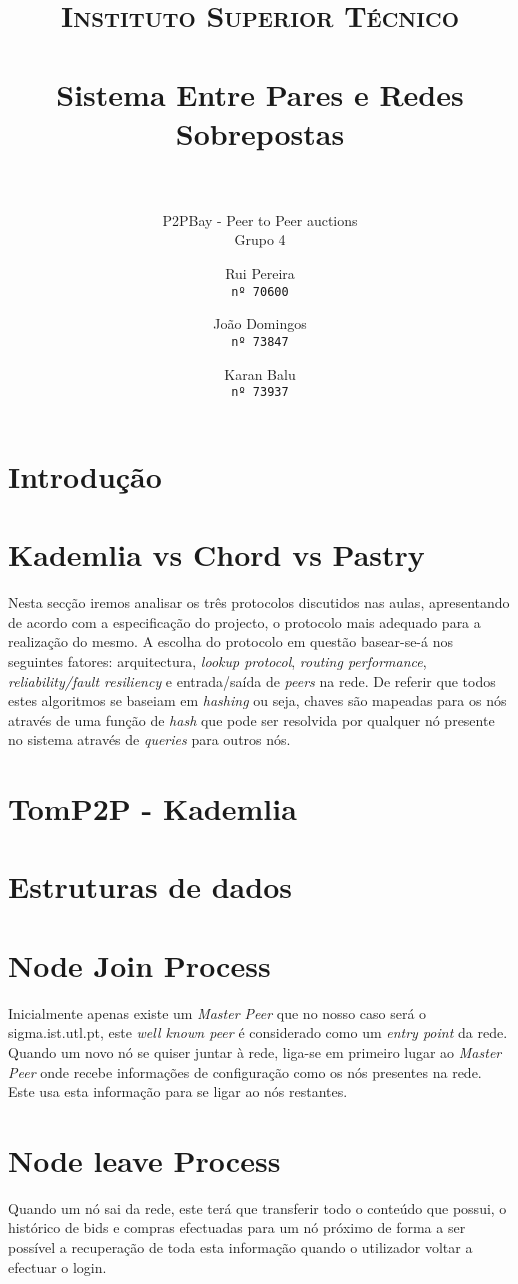 \documentclass[paper=a4, fontsize=11pt]{scrartcl}
\title{
		\usefont{OT1}{bch}{b}{n}
		\normalfont \normalsize \textsc{Instituto Superior Técnico} \\ [25pt]
		\horrule{0.5pt} \\[0.4cm]
		\huge Sistema Entre Pares e Redes Sobrepostas \\
		\horrule{2pt} \\[0.5cm]
}
\subtitle{P2PBay - Peer to Peer auctions\\\vspace{5mm}\small Grupo 4}
\author{
  \normalsize Rui Pereira\\
  \normalsize \texttt{nº 70600}
  \and
  \normalsize João Domingos\\
  \normalsize \texttt{nº 73847}
  \and
  \normalsize Karan Balu\\
  \normalsize \texttt{nº 73937}
}
\date{}
\numberwithin{equation}{section}		%
\numberwithin{figure}{section}			%
\numberwithin{table}{section}				%
\begin{document}
\maketitle
\section{Introdução}
\section{Kademlia vs Chord vs Pastry}
Nesta secção iremos analisar os três protocolos discutidos nas aulas, apresentando de acordo com a especificação do projecto, o protocolo mais
adequado para a realização do mesmo. A escolha do protocolo em questão basear-se-á nos seguintes fatores: arquitectura, \textit{lookup protocol}, \textit{routing performance}, \textit{reliability/fault resiliency} e entrada/saída de \textit{peers} na rede. De referir que todos estes algoritmos
se baseiam em \textit{hashing} ou seja, chaves são mapeadas para os nós através de uma função de \textit{hash} que pode ser resolvida por qualquer 
nó presente no sistema através de \textit{queries} para outros nós.
\section{TomP2P - Kademlia}
\section{Estruturas de dados}
\section{Node Join Process}
Inicialmente apenas existe um \textit{Master Peer} que no nosso caso será o sigma.ist.utl.pt, este \textit{well known peer} é considerado como um  \textit{entry point} da rede. Quando um novo nó se quiser juntar à rede, liga-se em primeiro lugar ao \textit{Master Peer} onde recebe informações de configuração como os nós presentes na rede. Este usa esta informação para se ligar ao nós restantes.
\section{Node leave Process}
Quando um nó sai da rede, este terá que transferir todo o conteúdo que possui, o histórico de bids e compras efectuadas para um nó próximo de forma a ser possível a recuperação de toda esta informação quando o utilizador voltar a efectuar o login.
\end{document}

